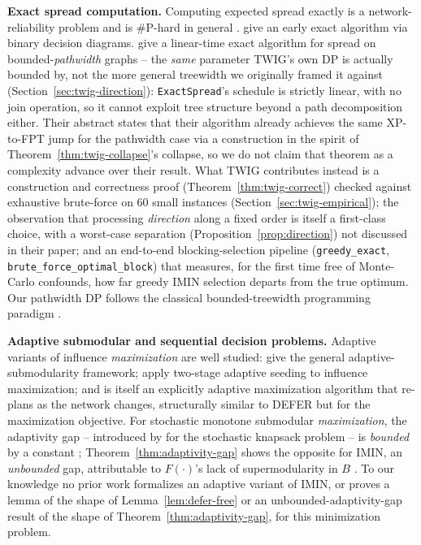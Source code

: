 \documentclass[ASNA,number]{USG}
\newcommand{\FF}{F}
\begin{document}
\textbf{Exact spread computation.} Computing expected spread exactly is a
network-reliability problem and is \#P-hard in general
\citep{valiant1979,provan1983}. \citet{maehara2017} give an early exact
algorithm via binary decision diagrams. \citet{nakamura2026} give a
linear-time exact algorithm for spread on bounded-\emph{pathwidth}
graphs -- the \emph{same} parameter TWIG's own DP is actually bounded by,
not the more general treewidth we originally framed it against
(Section~\ref{sec:twig-direction}): \texttt{ExactSpread}'s schedule is
strictly linear, with no join operation, so it cannot exploit tree
structure beyond a path decomposition either. Their abstract states that
their algorithm already achieves the same XP-to-FPT jump for the pathwidth
case via a construction in the spirit of
Theorem~\ref{thm:twig-collapse}'s collapse, so we do not claim that
theorem as a complexity advance over their result. What TWIG contributes
instead is a construction and correctness proof
(Theorem~\ref{thm:twig-correct}) checked against exhaustive brute-force on
60 small instances (Section~\ref{sec:twig-empirical}); the observation
that processing \emph{direction} along a fixed order is itself a
first-class choice, with a worst-case separation
(Proposition~\ref{prop:direction}) not discussed in their paper; and an
end-to-end blocking-selection pipeline (\texttt{greedy\_exact},
\texttt{brute\_force\_optimal\_block}) that measures, for the first time
free of Monte-Carlo confounds, how far greedy IMIN selection departs from
the true optimum. Our pathwidth DP follows the classical bounded-treewidth
programming paradigm \citep{bodlaender1988,cygan2015}.

\textbf{Adaptive submodular and sequential decision problems.} Adaptive
variants of influence \emph{maximization} are well studied:
\citet{golovinkrause2011} give the general adaptive-submodularity
framework; \citet{seemansinger2013} apply two-stage adaptive seeding to
influence maximization; and \citet{tong2017} is itself an explicitly
adaptive maximization algorithm that re-plans as the network changes,
structurally similar to DEFER but for the maximization objective. For
stochastic monotone submodular \emph{maximization}, the adaptivity gap --
introduced by \citet{deangoemansvondrak2008} for the stochastic knapsack
problem -- is \emph{bounded} by a constant
\citep{asadpournazerzadeh2016}; Theorem~\ref{thm:adaptivity-gap} shows the
opposite for IMIN, an \emph{unbounded} gap, attributable to
$\FF(\cdot)$'s lack of supermodularity in $B$
\citep[established by][]{xie2023}. To our knowledge no prior
work formalizes an adaptive variant of IMIN, or proves a lemma of the
shape of Lemma~\ref{lem:defer-free} or an unbounded-adaptivity-gap result
of the shape of Theorem~\ref{thm:adaptivity-gap}, for this minimization
problem.
\end{document}
